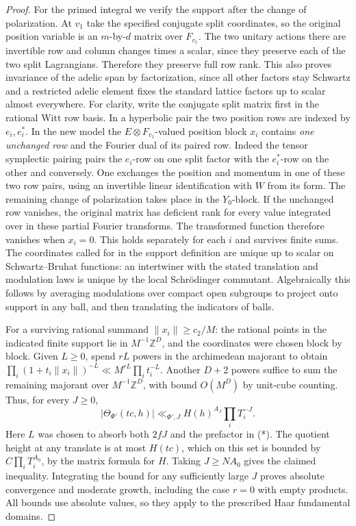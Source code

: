 \begin{proof}
For the primed integral we verify the support after the change of
polarization. At \(v_1\) take the specified conjugate split coordinates,
so the original position variable is an \(m\)-by-\(d\) matrix over
\(F_{v_1}\). The two unitary actions there are invertible row and
column changes times a scalar, since they preserve each of the two
split Lagrangians. Therefore they preserve full row rank. This also
proves invariance of the adelic span by factorization, since all other
factors stay Schwartz and a restricted adelic element fixes the
standard lattice factors up to scalar almost everywhere. For clarity,
write the conjugate split matrix first in the rational Witt row basis.
In a hyperbolic pair the two position rows are indexed by \(e_i,e_i^*\).
In the new model the \(E\otimes F_{v_1}\)-valued position block \(x_i\)
contains \emph{one unchanged row} and the Fourier dual of its paired
row. Indeed the tensor symplectic pairing pairs the \(e_i\)-row on
one split factor with the \(e_i^*\)-row on the other and conversely.
One exchanges the position and momentum in one of these two row
pairs, using an invertible linear identification with \(W\) from
its form. The remaining change of polarization takes place in the
\(Y_0\)-block. If the unchanged row vanishes, the original matrix has
deficient rank for every value integrated over in these partial
Fourier transforms. The transformed function therefore vanishes when
\(x_i=0\). This holds separately for each \(i\) and survives finite
sums. The coordinates called for in the support definition are unique
up to scalar on Schwartz--Bruhat functions: an intertwiner with the
stated translation and modulation laws is unique by the local
Schr\"odinger commutant. Algebraically this follows by averaging
modulations over compact open subgroups to project onto support in
any ball, and then translating the indicators of balls.

For a surviving rational summand \(\|x_i\|\ge c_2/M\): the rational
points in the indicated finite support lie in \(M^{-1}\mathbb Z^D\),
and the coordinates were chosen block by block. Given \(L\ge0\),
spend \(rL\) powers in the archimedean majorant to obtain
\(\prod_i (1+t_i\|x_i\|)^{-L}\ll M^{rL}\prod_i t_i^{-L}\).
Another \(D+2\) powers suffice to sum the remaining majorant over
\(M^{-1}\mathbb Z^D\), with bound \(O(M^D)\) by unit-cube counting.
Thus, for every \(J\ge0\),
\[
             |\Theta_{\Phi'}(tc,h)|
                    \ll_{\Phi',J} H(h)^{A_J}\prod_i T_i^{-J}.
\]
Here \(L\) was chosen to absorb both \(2fJ\) and the prefactor in (*).
The quotient height at any translate is at most \(H(tc)\), which on
this set is bounded by \(C\prod_i T_i^{A_0}\), by the matrix formula
for \(H\). Taking \(J\ge NA_0\) gives the claimed inequality.
Integrating the bound for any sufficiently large \(J\) proves
absolute convergence and moderate growth, including the case \(r=0\)
with empty products. All bounds use absolute values, so they apply
to the prescribed Haar fundamental domains.
\end{proof}

